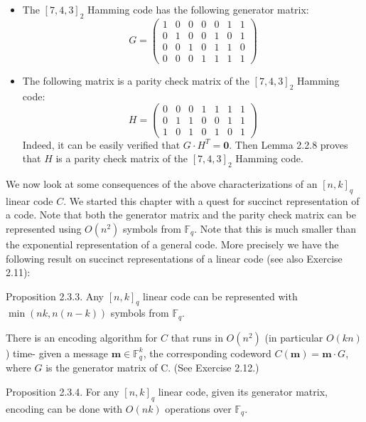 \documentclass[10pt]{article}
\begin{document}
\begin{itemize}
  \item[-] The $[7,4,3]_{2}$ Hamming code has the following generator matrix:
$$
G=\left(\begin{array}{lllllll}
1 & 0 & 0 & 0 & 0 & 1 & 1 \\
0 & 1 & 0 & 0 & 1 & 0 & 1 \\
0 & 0 & 1 & 0 & 1 & 1 & 0 \\
0 & 0 & 0 & 1 & 1 & 1 & 1
\end{array}\right)
$$
\end{itemize}

\begin{itemize}
  \item[-] The following matrix is a parity check matrix of the $[7,4,3]_{2}$ Hamming code:
$$
H=\left(\begin{array}{lllllll}
0 & 0 & 0 & 1 & 1 & 1 & 1 \\
0 & 1 & 1 & 0 & 0 & 1 & 1 \\
1 & 0 & 1 & 0 & 1 & 0 & 1
\end{array}\right)
$$
Indeed, it can be easily verified that $G \cdot H^{T}=\mathbf{0}$. Then Lemma 2.2.8 proves that $H$ is a parity check matrix of the $[7,4,3]_{2}$ Hamming code.
\end{itemize}

We now look at some consequences of the above characterizations of an $[n, k]_{q}$ linear code $C$. We started this chapter with a quest for succinct representation of a code. Note that both the generator matrix and the parity check matrix can be represented using $O\left(n^{2}\right)$ symbols from $\mathbb{F}_{q}$. Note that this is much smaller than the exponential representation of a general code. More precisely we have the following result on succinct representations of a linear code (see also Exercise 2.11):

Proposition 2.3.3. Any $[n, k]_{q}$ linear code can be represented with $\min (n k, n(n-k))$ symbols from $\mathbb{F}_{q}$.

There is an encoding algorithm for $C$ that runs in $O\left(n^{2}\right)$ (in particular $O(k n)$ ) time- given a message $\mathbf{m} \in \mathbb{F}_{q}^{k}$, the corresponding codeword $C(\mathbf{m})=\mathbf{m} \cdot G$, where $G$ is the generator matrix of C. (See Exercise 2.12.)

Proposition 2.3.4. For any $[n, k]_{q}$ linear code, given its generator matrix, encoding can be done with $O(n k)$ operations over $\mathbb{F}_{q}$.
\end{document}
